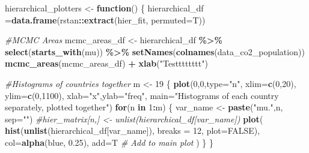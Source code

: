 \documentclass[
]{article}
\newenvironment{Shaded}{\begin{snugshade}}{\end{snugshade}}
\newcommand{\CommentTok}[1]{\textcolor[rgb]{0.56,0.35,0.01}{\textit{#1}}}
\newcommand{\ControlFlowTok}[1]{\textcolor[rgb]{0.13,0.29,0.53}{\textbf{#1}}}
\newcommand{\DataTypeTok}[1]{\textcolor[rgb]{0.13,0.29,0.53}{#1}}
\newcommand{\DecValTok}[1]{\textcolor[rgb]{0.00,0.00,0.81}{#1}}
\newcommand{\FloatTok}[1]{\textcolor[rgb]{0.00,0.00,0.81}{#1}}
\newcommand{\KeywordTok}[1]{\textcolor[rgb]{0.13,0.29,0.53}{\textbf{#1}}}
\newcommand{\NormalTok}[1]{#1}
\newcommand{\OperatorTok}[1]{\textcolor[rgb]{0.81,0.36,0.00}{\textbf{#1}}}
\newcommand{\OtherTok}[1]{\textcolor[rgb]{0.56,0.35,0.01}{#1}}
\newcommand{\StringTok}[1]{\textcolor[rgb]{0.31,0.60,0.02}{#1}}
\begin{document}
\begin{Shaded}
\begin{Highlighting}[]
\NormalTok{hierarchical\_plotters \textless{}{-}}\StringTok{ }\ControlFlowTok{function}\NormalTok{() \{}
\NormalTok{  hierarchical\_df =}\KeywordTok{data.frame}\NormalTok{(rstan}\OperatorTok{::}\KeywordTok{extract}\NormalTok{(hier\_fit, }\DataTypeTok{permuted=}\NormalTok{T))}
  
  \CommentTok{\#MCMC Areas}
\NormalTok{  mcmc\_areas\_df \textless{}{-}}\StringTok{ }\NormalTok{hierarchical\_df }\OperatorTok{\%\textgreater{}\%}\StringTok{ }\KeywordTok{select}\NormalTok{(}\KeywordTok{starts\_with}\NormalTok{(}\StringTok{\textquotesingle{}mu\textquotesingle{}}\NormalTok{)) }\OperatorTok{\%\textgreater{}\%}
\StringTok{                    }\KeywordTok{setNames}\NormalTok{(}\KeywordTok{colnames}\NormalTok{(data\_co2\_population))}
  \KeywordTok{mcmc\_areas}\NormalTok{(mcmc\_areas\_df) }\OperatorTok{+}\StringTok{ }\KeywordTok{xlab}\NormalTok{(}\StringTok{"Testttttttt"}\NormalTok{)}
  
  \CommentTok{\#Histograms of countries together}
\NormalTok{  m \textless{}{-}}\StringTok{ }\DecValTok{19}
\NormalTok{  \{}
  \KeywordTok{plot}\NormalTok{(}\DecValTok{0}\NormalTok{,}\DecValTok{0}\NormalTok{,}\DataTypeTok{type=}\StringTok{"n"}\NormalTok{,}
        \DataTypeTok{xlim=}\KeywordTok{c}\NormalTok{(}\DecValTok{0}\NormalTok{,}\DecValTok{20}\NormalTok{), }\DataTypeTok{ylim=}\KeywordTok{c}\NormalTok{(}\DecValTok{0}\NormalTok{,}\DecValTok{1100}\NormalTok{),}
        \DataTypeTok{xlab=}\StringTok{"x"}\NormalTok{,}\DataTypeTok{ylab=}\StringTok{"freq"}\NormalTok{, }
        \DataTypeTok{main=}\StringTok{"Histograms of each country separately, plotted together"}\NormalTok{)}
    \ControlFlowTok{for}\NormalTok{(n }\ControlFlowTok{in} \DecValTok{1}\OperatorTok{:}\NormalTok{m) \{}
\NormalTok{      var\_name \textless{}{-}}\StringTok{ }\KeywordTok{paste}\NormalTok{(}\StringTok{"mu."}\NormalTok{,n, }\DataTypeTok{sep=}\StringTok{""}\NormalTok{)}
      \CommentTok{\#hier\_matrix[n,] \textless{}{-} unlist(hierarchical\_df[var\_name])}
      \KeywordTok{plot}\NormalTok{(}
        \KeywordTok{hist}\NormalTok{(}\KeywordTok{unlist}\NormalTok{(hierarchical\_df[var\_name]), }\DataTypeTok{breaks =} \DecValTok{12}\NormalTok{, }\DataTypeTok{plot=}\OtherTok{FALSE}\NormalTok{),}
        \DataTypeTok{col=}\KeywordTok{alpha}\NormalTok{(}\StringTok{\textquotesingle{}blue\textquotesingle{}}\NormalTok{, }\FloatTok{0.25}\NormalTok{),}
        \DataTypeTok{add=}\NormalTok{T }\CommentTok{\# Add to main plot}
\NormalTok{        )  }
\NormalTok{    \}}
\NormalTok{  \}}
  

\end{Highlighting}
\end{Shaded}
\end{document}

